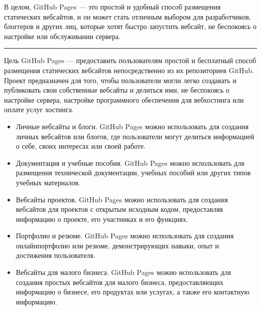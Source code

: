 \documentclass[letterpaper,10pt,russian]{sphinxmanual}
\begin{document}
\sphinxAtStartPar
В целом, GitHub Pages — это простой и удобный способ размещения статических веб\sphinxhyphen{}сайтов, и он может стать отличным выбором для разработчиков, блоггеров и других лиц, которые хотят быстро запустить веб\sphinxhyphen{}сайт, не беспокоясь о настройке или обслуживании сервера.


\bigskip\hrule\bigskip


\sphinxAtStartPar
{}
Цель GitHub Pages — предоставить пользователям простой и бесплатный способ размещения статических веб\sphinxhyphen{}сайтов непосредственно из их репозиториев GitHub. Проект предназначен для того, чтобы пользователи могли легко создавать и публиковать свои собственные веб\sphinxhyphen{}сайты и делиться ими, не беспокоясь о настройке сервера, настройке программного обеспечения для веб\sphinxhyphen{}хостинга или оплате услуг хостинга.

\sphinxAtStartPar
{}
\begin{itemize}
\item {} 
\sphinxAtStartPar
Личные веб\sphinxhyphen{}сайты и блоги. GitHub Pages можно использовать для создания личных веб\sphinxhyphen{}сайтов или блогов, где пользователи могут делиться информацией о себе, своих интересах или своей работе.

\item {} 
\sphinxAtStartPar
Документация и учебные пособия. GitHub Pages можно использовать для размещения технической документации, учебных пособий или других типов учебных материалов.

\item {} 
\sphinxAtStartPar
Веб\sphinxhyphen{}сайты проектов. GitHub Pages можно использовать для создания веб\sphinxhyphen{}сайтов для проектов с открытым исходным кодом, предоставляя информацию о проекте, его участниках и его функциях.

\item {} 
\sphinxAtStartPar
Портфолио и резюме. GitHub Pages можно использовать для создания онлайн\sphinxhyphen{}портфолио или резюме, демонстрирующих навыки, опыт и достижения пользователя.

\item {} 
\sphinxAtStartPar
Веб\sphinxhyphen{}сайты для малого бизнеса. GitHub Pages можно использовать для создания простых веб\sphinxhyphen{}сайтов для малого бизнеса, предоставляющих информацию о бизнесе, его продуктах или услугах, а также его контактную информацию.

\end{itemize}
\end{document}

